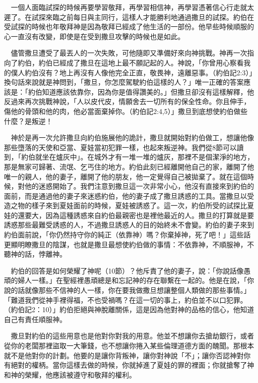 \documentclass{book}
\begin{document}
　一個人面臨試探的時候再要學習敬拜，再學習相信神，再學習憑著信心行走就太遲了。在試探來臨之前每日與主同行，這樣人才能勝利地通過撒旦的試探。約伯在受試探的時候也年敬拜神是因為敬拜已經成了他生活的一部份。他早些時候順服的心一直沒有改變，即使是在受到撒旦攻擊的時候也是如此。

　儘管撒旦遭受了最丟人的一次失敗，可他隨即又準備好來向神挑戰。神再一次指向了約伯，約伯已經成了撒旦在這地上最不願記起的人。神說，「你曾用心察看我的僕人約伯沒有？地上再沒有人像他完全正直，敬畏神，遠離惡事。（約伯記2:3）」換句話來說就是神問到，「撒旦，你怎麼駕駛約伯這樣的人？」唯一正確的答案應該是：「約伯知道應該依靠你，因為你是值得讚美的。」但撒旦卻沒有這樣解釋，他反過來再次挑戰神說，「人以皮代皮，情願舍去一切所有的保全性命。你且伸手，傷他的骨頭和他的肉，他必當面棄掉你。（約伯記2:4,5）」撒旦到底想使約伯做些什麼？是叛逆！

　神於是再一次允許撒旦向約伯施展他的詭計，撒旦就開始對約伯做工，想讓他像那些墮落的天使和亞當、夏娃當初犯罪一樣，也起來叛逆神。我們從8節可以讀到，「約伯就坐在爐灰中」。在城外才有一堆一堆的爐灰，那裡不是個潔淨的地方，那是無家可歸著、流氓、乞丐住的地方。約伯此刻已經離開他自己的家，離開了他唯一的親人，他的妻子，離開了他的朋友，他一定覺得自己被拋棄了。就在這個時候，對他的迷惑開始了。我們注意到撒旦這一次非常小心，他沒有直接來到約伯的面前，而是通過他的妻子來迷惑約伯，他的妻子成了撒旦誘惑的工具。當撒旦以受造之物的樣子來到夏娃面前的時候，夏娃被誘惑了。這一次，約伯所受的試探比夏娃的還要大，因為這種誘惑來自約伯最親密也是裡他最近的人。撒旦的打算就是要誘惑那些最難受誘惑的人，不過撒旦誘惑人的目的始終未不會變。約伯的妻子來到約伯面前說，「你仍然持守你的純正（依靠神）嗎？你棄掉神，死了吧！」這些話更顯明瞭撒旦的陰謀，也就是撒旦最想使約伯做的事情：不依靠神，不順服神，不聽神的話，悖離神。

　約伯的回答是如何榮耀了神呢（10節）？他斥責了他的妻子，說：「你說話像愚頑的婦人一樣。」在聖經裡愚頑總是和忘記神的存在聯繫在一起的。他是在說，「你說的話就像那些不信神的人一樣，你在要我做撒旦想讓整個人類做的那些事情。」「難道我們從神手裡得福，不也受禍嗎？在這一切的事上，約伯並不以口犯罪。（約伯記2：10）」約伯拒絕與神脫離關係，這是因為他對神的品格的信心，他知道自己有責任順服神。

　撒旦對約伯的這些用意也是他對你對我的用意。他並不想讓你去搶劫銀行，或者從你的老闆那裡盜取一大筆錢，也不想讓你捲入某些倫理道德方面的醜聞。那根本就不是他對你的計劃。他要的是讓你背叛神，讓你對神說「不」；讓你否認神對你有絕對的權柄。當你這樣去做的時候，你就掉進了夏娃的罪的裡面；你就搶奪了神和神的榮耀，他應該被遵守和敬拜的權利。
\end{document}
